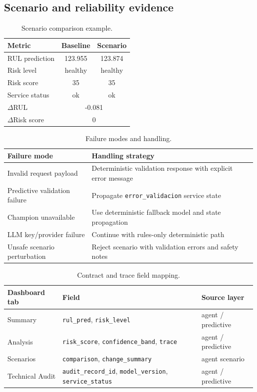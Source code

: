 \documentclass[11pt]{article}
\begin{document}
\subsection{Scenario and reliability evidence}
\begin{table}[H]
\centering
\caption{Scenario comparison example.}
\label{tab:scenario_example}
\begin{tabular}{lcc}
\toprule
Metric & Baseline & Scenario \\
\midrule
RUL prediction & 123.955 & 123.874 \\
Risk level & healthy & healthy \\
Risk score & 35 & 35 \\
Service status & ok & ok \\
\midrule
$\Delta$RUL & \multicolumn{2}{c}{-0.081} \\
$\Delta$Risk score & \multicolumn{2}{c}{0} \\
\bottomrule
\end{tabular}
\end{table}

\begin{table}[H]
\centering
\caption{Failure modes and handling.}
\label{tab:failure_modes}
\begin{tabularx}{\textwidth}{lX}
\toprule
Failure mode & Handling strategy \\
\midrule
Invalid request payload & Deterministic validation response with explicit error message \\
Predictive validation failure & Propagate \texttt{error\_validacion} service state \\
Champion unavailable & Use deterministic fallback model and state propagation \\
LLM key/provider failure & Continue with rules-only deterministic path \\
Unsafe scenario perturbation & Reject scenario with validation errors and safety notes \\
\bottomrule
\end{tabularx}
\end{table}

\begin{table}[H]
\centering
\caption{Contract and trace field mapping.}
\label{tab:contracts}
\begin{tabular}{lll}
\toprule
Dashboard tab & Field & Source layer \\
\midrule
Summary & \texttt{rul\_pred}, \texttt{risk\_level} & agent / predictive \\
Analysis & \texttt{risk\_score}, \texttt{confidence\_band}, \texttt{trace} & agent / predictive \\
Scenarios & \texttt{comparison}, \texttt{change\_summary} & agent scenario \\
Technical Audit & \texttt{audit\_record\_id}, \texttt{model\_version}, \texttt{service\_status} & agent / predictive \\
\bottomrule
\end{tabular}
\end{table}
\end{document}
